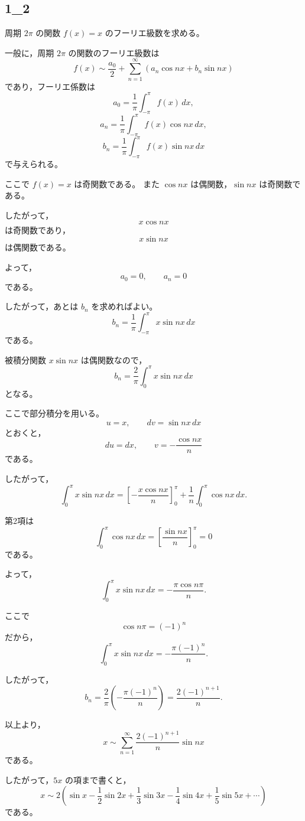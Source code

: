 
\subsection{1_2}
\begin{solution}
	周期 \(2\pi\) の関数 \(f(x)=x\) のフーリエ級数を求める。
	
	一般に，周期 \(2\pi\) の関数のフーリエ級数は
	\[
	f(x)\sim \frac{a_0}{2}
	+\sum_{n=1}^{\infty}
	\left(a_n\cos nx+b_n\sin nx\right)
	\]
	であり，フーリエ係数は
	\[
	a_0=\frac{1}{\pi}\int_{-\pi}^{\pi}f(x)\,dx,
	\]
	\[
	a_n=\frac{1}{\pi}\int_{-\pi}^{\pi}f(x)\cos nx\,dx,
	\]
	\[
	b_n=\frac{1}{\pi}\int_{-\pi}^{\pi}f(x)\sin nx\,dx
	\]
	で与えられる。
	
	ここで \(f(x)=x\) は奇関数である。
	また \(\cos nx\) は偶関数，\(\sin nx\) は奇関数である。
	
	したがって，
	\[
	x\cos nx
	\]
	は奇関数であり，
	\[
	x\sin nx
	\]
	は偶関数である。
	
	よって，
	\[
	a_0=0,\qquad a_n=0
	\]
	である。
	
	したがって，あとは \(b_n\) を求めればよい。
	\[
	b_n
	=
	\frac{1}{\pi}\int_{-\pi}^{\pi}x\sin nx\,dx
	\]
	である。
	
	被積分関数 \(x\sin nx\) は偶関数なので，
	\[
	b_n
	=
	\frac{2}{\pi}\int_0^\pi x\sin nx\,dx
	\]
	となる。
	
	ここで部分積分を用いる。
	\[
	u=x,\qquad dv=\sin nx\,dx
	\]
	とおくと，
	\[
	du=dx,\qquad v=-\frac{\cos nx}{n}
	\]
	である。
	
	したがって，
	\[
	\int_0^\pi x\sin nx\,dx
	=
	\left[-\frac{x\cos nx}{n}\right]_0^\pi
	+
	\frac{1}{n}\int_0^\pi \cos nx\,dx.
	\]
	
	第2項は
	\[
	\int_0^\pi \cos nx\,dx
	=
	\left[\frac{\sin nx}{n}\right]_0^\pi
	=0
	\]
	である。
	
	よって，
	\[
	\int_0^\pi x\sin nx\,dx
	=
	-\frac{\pi\cos n\pi}{n}.
	\]
	
	ここで
	\[
	\cos n\pi=(-1)^n
	\]
	だから，
	\[
	\int_0^\pi x\sin nx\,dx
	=
	-\frac{\pi(-1)^n}{n}.
	\]
	
	したがって，
	\[
	b_n
	=
	\frac{2}{\pi}
	\left(
	-\frac{\pi(-1)^n}{n}
	\right)
	=
	\frac{2(-1)^{n+1}}{n}.
	\]
	
	以上より，
	\[
	x\sim
	\sum_{n=1}^{\infty}
	\frac{2(-1)^{n+1}}{n}\sin nx
	\]
	である。
	
	したがって，\(5x\) の項まで書くと，
	\[
	\boxed{
		x\sim
		2\left(
		\sin x
		-\frac{1}{2}\sin 2x
		+\frac{1}{3}\sin 3x
		-\frac{1}{4}\sin 4x
		+\frac{1}{5}\sin 5x
		+\cdots
		\right)
	}
	\]
	である。
\end{solution}